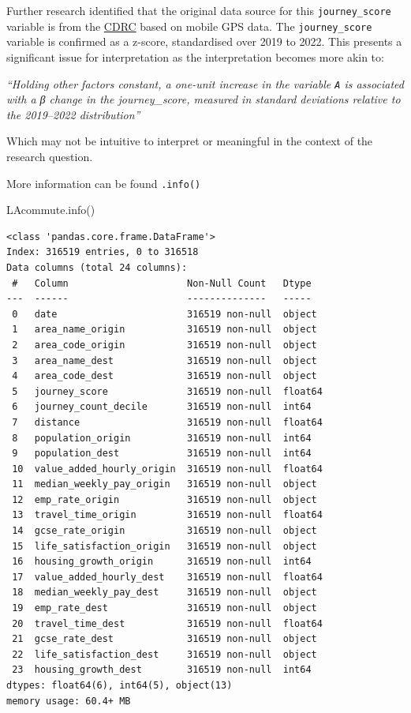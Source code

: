 \documentclass[
  number]{elsarticle}
\newenvironment{Shaded}{\begin{snugshade}}{\end{snugshade}}
\newcommand{\NormalTok}[1]{\textcolor[rgb]{0.00,0.23,0.31}{#1}}
\begin{document}
Further research identified that the original data source for this
\texttt{\textquotesingle{}journey\_score\textquotesingle{}} variable is
from the
\href{https://data.cdrc.ac.uk/dataset/spectus-origin-destination-derived-mobility-data}{CDRC}
based on mobile GPS data. The
\texttt{\textquotesingle{}journey\_score\textquotesingle{}} variable is
confirmed as a z-score, standardised over 2019 to 2022. This presents a
significant issue for interpretation as the interpretation becomes more
akin to:

\emph{``Holding other factors constant, a one-unit increase in the
variable \texttt{\textquotesingle{}A\textquotesingle{}} is associated
with a β change in the journey\_score, measured in standard deviations
relative to the 2019--2022 distribution''}

Which may not be intuitive to interpret or meaningful in the context of
the research question.

More information can be found \texttt{.info()}

\begin{Shaded}
\begin{Highlighting}[]
\NormalTok{LAcommute.info()}
\end{Highlighting}
\end{Shaded}

\begin{verbatim}
<class 'pandas.core.frame.DataFrame'>
Index: 316519 entries, 0 to 316518
Data columns (total 24 columns):
 #   Column                     Non-Null Count   Dtype  
---  ------                     --------------   -----  
 0   date                       316519 non-null  object 
 1   area_name_origin           316519 non-null  object 
 2   area_code_origin           316519 non-null  object 
 3   area_name_dest             316519 non-null  object 
 4   area_code_dest             316519 non-null  object 
 5   journey_score              316519 non-null  float64
 6   journey_count_decile       316519 non-null  int64  
 7   distance                   316519 non-null  float64
 8   population_origin          316519 non-null  int64  
 9   population_dest            316519 non-null  int64  
 10  value_added_hourly_origin  316519 non-null  float64
 11  median_weekly_pay_origin   316519 non-null  object 
 12  emp_rate_origin            316519 non-null  object 
 13  travel_time_origin         316519 non-null  float64
 14  gcse_rate_origin           316519 non-null  object 
 15  life_satisfaction_origin   316519 non-null  object 
 16  housing_growth_origin      316519 non-null  int64  
 17  value_added_hourly_dest    316519 non-null  float64
 18  median_weekly_pay_dest     316519 non-null  object 
 19  emp_rate_dest              316519 non-null  object 
 20  travel_time_dest           316519 non-null  float64
 21  gcse_rate_dest             316519 non-null  object 
 22  life_satisfaction_dest     316519 non-null  object 
 23  housing_growth_dest        316519 non-null  int64  
dtypes: float64(6), int64(5), object(13)
memory usage: 60.4+ MB
\end{verbatim}
\end{document}
